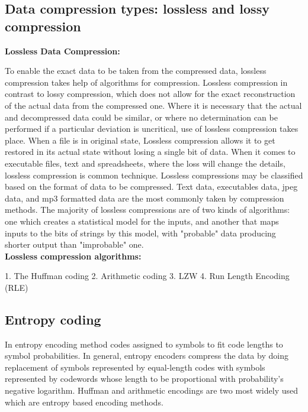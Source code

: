 \documentclass[a4paper, 12pt]{article}
\begin{document}
\subsection{Data compression types: lossless and lossy compression}
\textbf{Lossless Data Compression:}
\par To enable the exact data to be taken from the compressed data, lossless compression takes help of algorithms for compression. Lossless compression in contrast to lossy compression, which does not allow for the exact reconstruction of the actual data from the compressed one. Where it is necessary that the actual and decompressed data could be similar, or where no determination can be performed if a particular deviation is uncritical, use of lossless compression takes place. When a file is in original state, Lossless compression allows it to get restored in its actual state without losing a single bit of data.
When it comes to executable files, text and spreadsheets, where the loss will 
change the details, lossless compression is common technique. Lossless compressions may be classified based on the format of data to be compressed. Text data, executables data, jpeg data, and mp3 formatted data are the most commonly taken by compression methods. The majority of lossless compressions are of two kinds of algorithms: one which creates a statistical model for the inputs, and another that maps inputs to the bits of strings by this model, with "probable" data producing shorter output than "improbable" one.
\\
\textbf{Lossless compression algorithms:}
\par
1. The Huffman coding
2. Arithmetic coding
3. LZW
4. Run Length Encoding (RLE)

\subsection{Entropy coding}
\par
\hspace{1cm}In entropy encoding method codes assigned to symbols to fit code lengths to symbol 
probabilities. In general, entropy encoders compress the data by doing replacement of
symbols represented by equal-length codes with symbols represented by codewords 
whose length to be proportional with probability's negative logarithm. Huffman and 
arithmetic encodings are two most widely used which are entropy based encoding methods. 
\\
\end{document}
